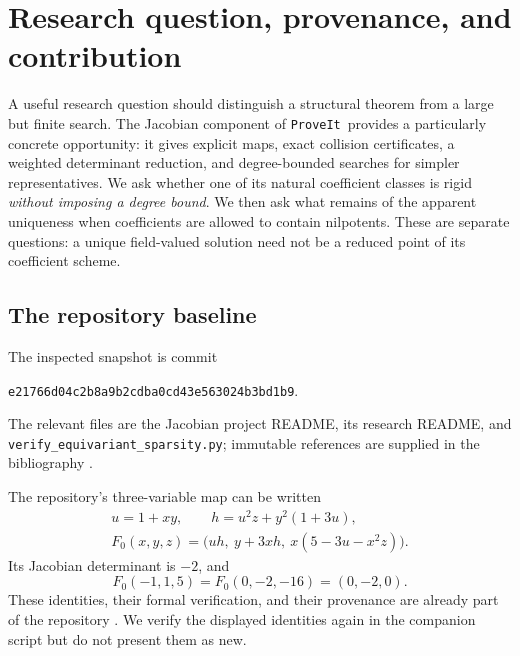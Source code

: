 \documentclass[11pt,a4paper]{article}
\numberwithin{equation}{section}
\theoremstyle{definition}
\theoremstyle{remark}
\newcommand{\repo}{\texttt{ProveIt}}
\begin{document}
\begingroup
\footnotesize
\setlength{\parskip}{0pt}
\tableofcontents
\endgroup
\newpage

\section{Research question, provenance, and contribution}
\label{sec:intro}

A useful research question should distinguish a structural theorem from a
large but finite search. The Jacobian component of \repo\ provides a
particularly concrete opportunity: it gives explicit maps, exact collision
certificates, a weighted determinant reduction, and degree-bounded searches
for simpler representatives. We ask whether one of its natural coefficient
classes is rigid \emph{without imposing a degree bound}. We then ask what
remains of the apparent uniqueness when coefficients are allowed to contain
nilpotents. These are separate questions: a unique field-valued solution
need not be a reduced point of its coefficient scheme.

\subsection{The repository baseline}

The inspected snapshot is commit
\begin{center}
\texttt{e21766d04c2b8a9b2cdba0cd43e563024b3bd1b9}.
\end{center}
The relevant files are the Jacobian project README, its research README, and
\texttt{verify\_equivariant\_sparsity.py}; immutable references are supplied
in the bibliography \cite{repo-main,repo-research,repo-sparsity}.

The repository's three-variable map can be written
\begin{equation}\label{eq:original}
\begin{gathered}
u=1+xy,\qquad h=u^2z+y^2(1+3u),\\
F_0(x,y,z)=\bigl(uh,\ y+3xh,\ x(5-3u-x^2z)\bigr).
\end{gathered}
\end{equation}
Its Jacobian determinant is $-2$, and
\begin{equation}\label{eq:oldcollision}
F_0(-1,1,5)=F_0(0,-2,-16)=(0,-2,0).
\end{equation}
These identities, their formal verification, and their provenance are
already part of the repository \cite{repo-main}. We verify the displayed
identities again in the companion script but do not present them as new.
\end{document}
